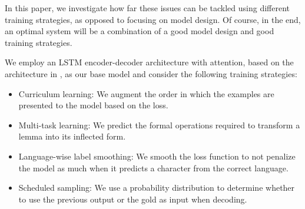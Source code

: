 \documentclass[11pt,a4paper]{article}
\begin{document}
In this paper, we investigate how far these issues can be tackled
using different training strategies, as opposed to focusing on model
design. Of course, in the end, an optimal system will be a
combination of a good model design and good training strategies.





We employ an LSTM encoder-decoder architecture with attention, based on
the architecture in , as our
base model and consider the following training strategies:

\begin{itemize}
\item Curriculum learning: We augment the order in which the examples are presented to the model based on the loss.
\item Multi-task learning: We predict the formal operations required to transform a lemma into its inflected form.
\item Language-wise label smoothing: We smooth the loss function to not penalize the model as much when it predicts a character from the correct language.
\item Scheduled sampling: We use a probability distribution to determine whether to use the previous output or the gold as input when decoding.
\end{itemize}

%
\end{document}
